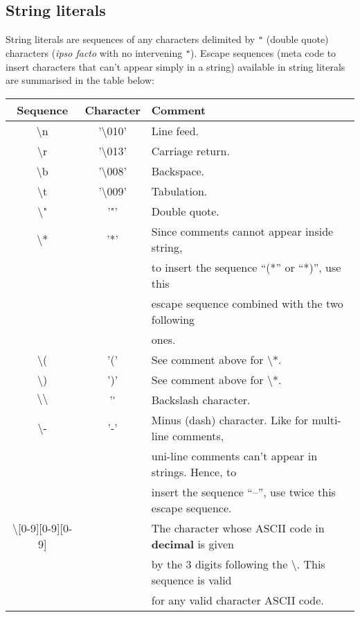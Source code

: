 \subsection{String literals}
\label{string literal}
String literals are sequences of any characters delimited by {\tt "}
(double quote) characters ({\em ipso facto} with no intervening
{\tt"}). 
Escape sequences (meta code to insert characters that can't appear
simply in a string) available in string literals are summarised in the
table below:

\medskip
\noindent
\begin{tabular}{|c|c|l|}
  \hline
  Sequence & Character & Comment \\
  \hline
  $\setminus$n & '$\setminus$010' & Line feed. \\
  \hline
  $\setminus$r & '$\setminus$013' & Carriage return. \\
  \hline
  $\setminus$b & '$\setminus$008' & Backspace. \\
  \hline
  $\setminus$t & '$\setminus$009' & Tabulation. \\
  \hline
  $\setminus$" & '"'              & Double quote. \\
  \hline
  $\setminus$* & '*'              & Since comments cannot appear
                                    inside string, \\
               &                  & to insert the
                                    sequence ``(*'' or ``*)'', use this \\
               &                  & escape sequence combined with the
                                    two following \\
               &                  & ones. \\
  \hline
  $\setminus$( & '('              & See comment above for $\setminus$*. \\
  \hline
  $\setminus$) & ')'              & See comment above for $\setminus$*. \\
  \hline
  $\setminus\setminus$ & '\'      & Backslash character. \\
  \hline
  $\setminus$- & '-' & Minus (dash) character. Like for multi-line
                                    comments, \\
               &                  & uni-line comments can't
                                    appear in strings. Hence, to \\
               &                  & insert the sequence ``--'', use
                                    twice this escape sequence. \\
  \hline
  $\setminus$[0-9][0-9][0-9] & & The character whose ASCII code in
                                {\bf decimal} is given \\
               &                  & by the 3 digits following the
                                  $\setminus$. This sequence is valid \\
               &                  & for any valid character
      ASCII code.\\
  \hline
\end{tabular}

